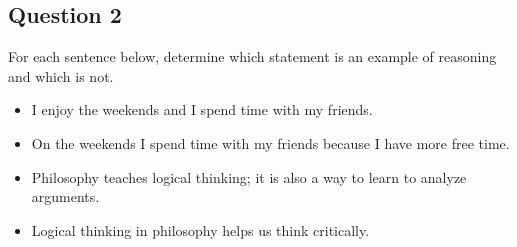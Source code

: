 \subsection{Question 2}
For each sentence below, determine which statement is an example of 
reasoning and which is not.

\begin{itemize}
    \item I enjoy the weekends and I spend time with my friends.
    \item On the weekends I spend time with my friends because I have more free time.
    \item Philosophy teaches logical thinking; it is also a way to learn to analyze arguments.
    \item Logical thinking in philosophy helps us think critically.
\end{itemize}

\pagebreak

\section{}